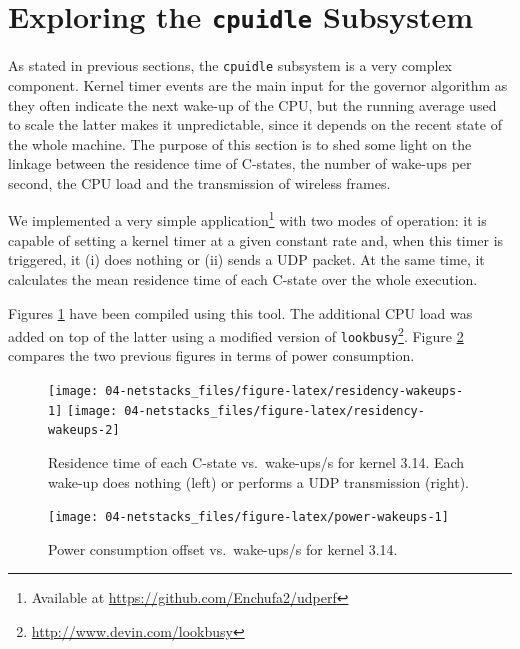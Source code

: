 \documentclass[twoside,nohyper]{tufte-book}
\theoremstyle{definition}
\theoremstyle{definition}
\theoremstyle{definition}
\theoremstyle{remark}
\begin{document}
\section{\texorpdfstring{Exploring the \texttt{cpuidle}
Subsystem}{Exploring the cpuidle Subsystem}}\label{exploring-the-cpuidle-subsystem}

As stated in previous sections, the \texttt{cpuidle} subsystem is a very
complex component. Kernel timer events are the main input for the
governor algorithm as they often indicate the next wake-up of the CPU,
but the running average used to scale the latter makes it unpredictable,
since it depends on the recent state of the whole machine. The purpose
of this section is to shed some light on the linkage between the
residence time of C-states, the number of wake-ups per second, the CPU
load and the transmission of wireless frames.

We implemented a very simple application\footnote{Available at
  \url{https://github.com/Enchufa2/udperf}} with two modes of operation:
it is capable of setting a kernel timer at a given constant rate and,
when this timer is triggered, it (i) does nothing or (ii) sends a UDP
packet. At the same time, it calculates the mean residence time of each
C-state over the whole execution.

Figures \ref{fig:residency-wakeups} have been compiled using this tool.
The additional CPU load was added on top of the latter using a modified
version of \texttt{lookbusy}\footnote{\url{http://www.devin.com/lookbusy}}.
Figure \ref{fig:power-wakeups} compares the two previous figures in
terms of power consumption.





\begin{figure}

{\centering \texttt{[image: 04-netstacks\_files/figure-latex/residency-wakeups-1]} \texttt{[image: 04-netstacks\_files/figure-latex/residency-wakeups-2]} 

}

\caption[Residence time of each C-state vs.~wake-ups/s
for kernel 3.14. Each wake-up does nothing (left) or performs a UDP
transmission (right).]{Residence time of each C-state vs.~wake-ups/s
for kernel 3.14. Each wake-up does nothing (left) or performs a UDP
transmission (right).}\label{fig:residency-wakeups}
\end{figure}




\begin{figure}

{\centering \texttt{[image: 04-netstacks\_files/figure-latex/power-wakeups-1]} 

}

\caption[Power consumption offset vs.~wake-ups/s for kernel
3.14.]{Power consumption offset vs.~wake-ups/s for kernel
3.14.}\label{fig:power-wakeups}
\end{figure}
\end{document}

